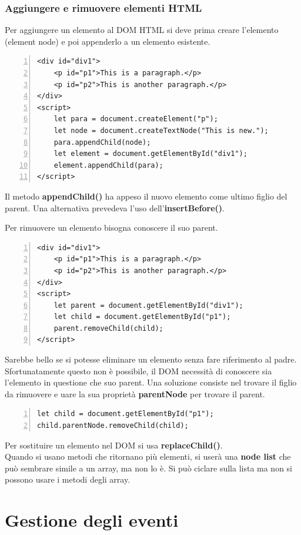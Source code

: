 \subsection{Aggiungere e rimuovere elementi HTML}
Per aggiungere un elemento al DOM HTML si deve prima creare l'elemento (element node) e poi appenderlo a un elemento esistente.

\begin{Verbatim}[numbers = left, frame = single]
<div id="div1">
    <p id="p1">This is a paragraph.</p>
    <p id="p2">This is another paragraph.</p>
</div>
<script>
    let para = document.createElement("p");
    let node = document.createTextNode("This is new.");
    para.appendChild(node);
    let element = document.getElementById("div1");
    element.appendChild(para);
</script>
\end{Verbatim}
Il metodo \textbf{appendChild()} ha appeso il nuovo elemento come ultimo figlio del parent. Una alternativa prevedeva l'uso dell'\textbf{insertBefore()}. 

Per rimuovere un elemento bisogna conoscere il suo parent. 
\begin{Verbatim}[numbers = left, frame = single]
<div id="div1">
    <p id="p1">This is a paragraph.</p>
    <p id="p2">This is another paragraph.</p>
</div>
<script>
    let parent = document.getElementById("div1");
    let child = document.getElementById("p1");
    parent.removeChild(child);
</script>
\end{Verbatim}
Sarebbe bello se si potesse eliminare un elemento senza fare riferimento al padre. Sfortunatamente questo non è possibile, il DOM necessità di conoscere sia l'elemento in questione che suo parent. Una soluzione consiste nel trovare il figlio da rimuovere e uare la sua proprietà \textbf{parentNode} per trovare il parent. 
\begin{Verbatim}[numbers = left, frame = single]
let child = document.getElementById("p1");
child.parentNode.removeChild(child);
\end{Verbatim}
Per sostituire un elemento nel DOM si usa \textbf{replaceChild()}. \\

Quando si usano metodi che ritornano più elementi, si userà una \textbf{node list} che può sembrare simile a un array, ma non lo è. Si può ciclare sulla lista ma non si possono usare i metodi degli array.

\chapter{Gestione degli eventi}
